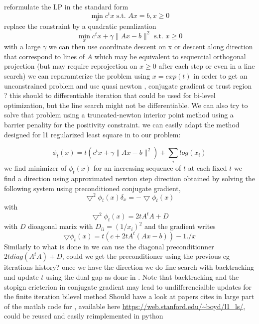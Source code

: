 \documentclass[11pt]{article}
\begin{document}
reformulate the LP in the standard form 
\begin{equation}
\mathop{min}_x c^tx \text{ s.t. } Ax=b, x\geq 0
\end{equation}
replace the constraint by a quadratic penalization
\begin{equation}
\mathop{min}_x c^tx +\gamma\|Ax-b\|^2 \text{ s.t. }x\geq 0
\end{equation}
with a  large $\gamma$
we can then use coordinate descent on x
or descent along direction that correspond to lines of $A$ which may be equivalent to sequential orthogonal projection (but may require reprojection on $x\geq 0$ after each step or even in a line search)
we can reparamterize the problem using $x=exp(t)$
in order to get an unconstrained problem and use quasi newton , conjugate gradient or trust region ? 
this should to differentiable iteration that could be used for bi-level optimization, but the line search might not be differentiable.
We can also try to solve that problem using a truncated-newton interior point method using a barrier penality for the positivity constraint.
we can easily adapt the method designed for l1 regularized least square in \cite{Kim2007} to our problem:

\begin{equation}
\phi_t(x)=t(c^tx +\gamma\|Ax-b\|^2) +\sum_i log(x_i)
\end{equation}
we find minimizer of $\phi_t(x)$ for an increasing sequence of $t$
at each fixed $t$ we find a direction using approximated newton step direction obtained by solving the following system using preconditioned conjugate gradient, 
\begin{equation}
\bigtriangledown^2\phi_t(x)\delta_x=-\bigtriangledown \phi_t(x)
\end{equation}
with 
\begin{equation}
\bigtriangledown^2\phi_t(x)=2tA^tA+D
\end{equation}
with $D$ dioagonal marix with $D_{ii}=(1/x_i)^2$
and the gradient writes
\begin{equation}
\bigtriangledown\phi_t(x)=t(c+2tA^t(Ax-b))-1./x
\end{equation}
Similarly to what is done in \cite{Kim2007}  we can use the diagonal preconditionner $2tdiag(A^tA)+D$, could we get the preconditioner using the previous cg iterations history?
once we have the direction we do line search with backtracking and update $t$
using the dual gap as done in  \cite{Kim2007}.
Note that backtracking and the stopign crieterion in conjugate gradient may lead to undifferencialble updates for the finite iteration bilevel method
 Should have a look at papers cites in  \cite{Kim2007} 
 large part of the matlab code for \cite{Kim2007} , available here  \url{https://web.stanford.edu/~boyd/l1_ls/},
  could be reused and easily reimplemented in python
\end{document}
